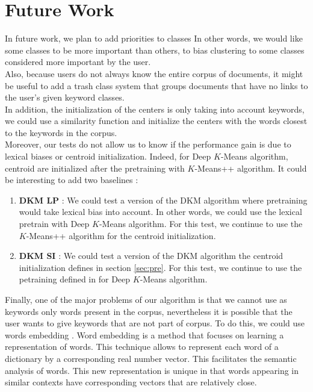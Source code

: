 \section{Future Work}
In future work, we plan to add priorities to classes In other words, we would like some classes
to be more important than others, to bias clustering to some classes considered more
important by the user.
\\Also, because users do not always know the entire corpus of
documents, it might be useful to add a trash class system that groups documents
that have no links to the user's given keyword classes.
\\In addition, the
initialization of the centers is only taking into account keywords, we could use
a similarity function and initialize the centers with the words closest to the
keywords in the corpus.
\\Moreover, our tests do not allow us to know if the performance gain is due to 
lexical biases or centroid initialization. Indeed, for Deep $K$-Means algorithm, 
centroid are initialized after the pretraining with $K$-Means++ algorithm. It 
could be interesting to add two baselines :
\begin{enumerate}
\item \textbf{DKM LP} : We could test a version of the DKM algorithm where 
  pretraining would take lexical bias into account. In other words, we could use 
  the lexical pretrain with Deep $K$-Means algorithm. For this test, we 
  continue to use the $K$-Means++ algorithm for the centroid initialization. 
\item \textbf{DKM SI} : We could test a version of the DKM algorithm the 
  centroid initialization defines in section \ref{sec:pre}. For this test, we 
  continue to use the petraining defined in \cite{Deap-K-Means} for Deep 
  $K$-Means algorithm.
\end{enumerate}  
Finally, one of the major problems of our algorithm is
that we cannot use as keywords only words present in the corpus, nevertheless
it is possible that the user wants to give keywords that are not part of corpus.
To do this, we could use words embedding \cite{2013arXiv1301.3781M}.
Word embedding is a method that focuses on learning a representation of words. 
This technique allows to represent each word of a dictionary by a 
corresponding real number vector. This facilitates the semantic analysis of 
words. This new representation is unique in that words appearing in similar 
contexts have corresponding vectors that are relatively close.